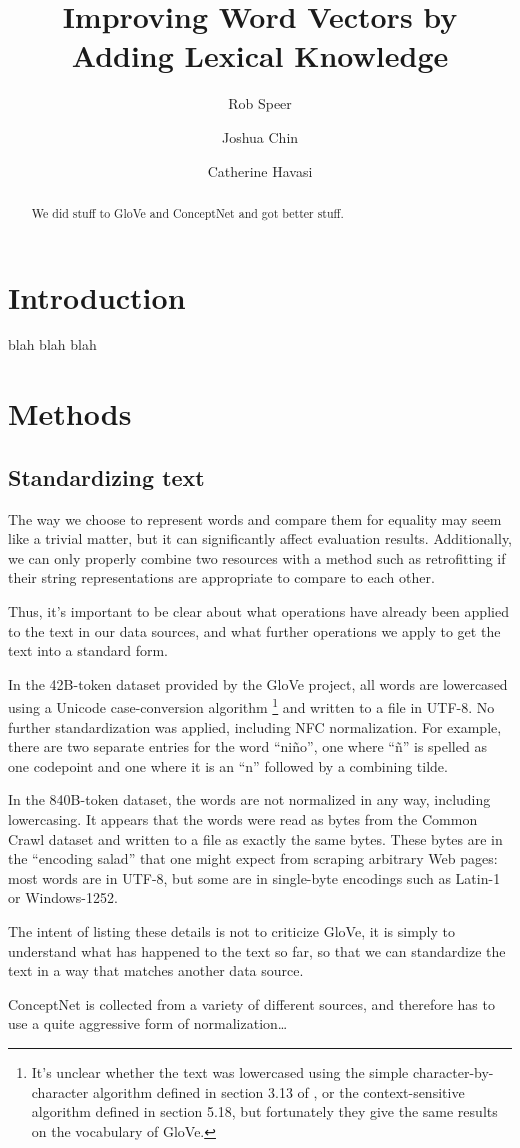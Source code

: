 \documentclass{article}
\title{Improving Word Vectors by Adding Lexical Knowledge}
\author{Rob Speer \and Joshua Chin \and Catherine Havasi}
\begin{document}
\maketitle
\begin{abstract}
We did stuff to GloVe and ConceptNet and got better stuff.
\end{abstract}

\section{Introduction}
blah blah blah

\section{Methods}

\subsection{Standardizing text}

The way we choose to represent words and compare them for equality may seem
like a trivial matter, but it can significantly affect evaluation results.
Additionally, we can only properly combine two resources with a method such
as retrofitting if their string representations are appropriate to compare
to each other.

Thus, it's important to be clear about what operations have already been
applied to the text in our data sources, and what further operations we
apply to get the text into a standard form.

In the 42B-token dataset provided by the GloVe project, all words are lowercased
using a Unicode case-conversion algorithm
\footnote{
    It's unclear whether the text was lowercased using the simple
    character-by-character algorithm defined in section 3.13 of
    \cite{unicode2014}, or the context-sensitive algorithm defined in section
    5.18, but fortunately they give the same results on the vocabulary of
    GloVe.
} and written to a file in UTF-8. No further standardization was applied, including
NFC normalization. For example, there are two separate entries for the word ``niño'',
one where ``ñ'' is spelled as one codepoint and one where it is an ``n'' followed by
a combining tilde.

In the 840B-token dataset, the words are not normalized in any way, including
lowercasing. It appears that the words were read as bytes from the Common Crawl
dataset and written to a file as exactly the same bytes. These bytes are in the
``encoding salad'' that one might expect from scraping arbitrary Web pages:
most words are in UTF-8, but some are in single-byte encodings such as Latin-1
or Windows-1252.

The intent of listing these details is not to criticize GloVe, it is simply to
understand what has happened to the text so far, so that we can standardize the
text in a way that matches another data source.

ConceptNet is collected from a variety of different sources, and therefore has to
use a quite aggressive form of normalization\ldots
\end{document}
